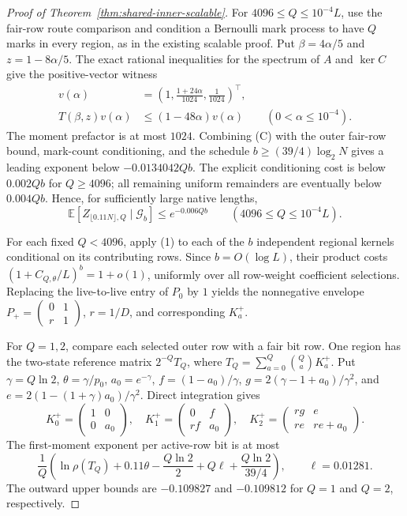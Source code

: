 \begin{proof}[Proof of Theorem~\ref{thm:shared-inner-scalable}]
For $4096\le Q\le10^{-4}L$, use the fair-row route comparison and
condition a Bernoulli mark process to have $Q$ marks in every region,
as in the existing scalable proof. Put $\beta=4\alpha/5$ and
$z=1-8\alpha/5$. The exact rational inequalities for the spectrum
of $A$ and $\ker C$ give the positive-vector witness
\[
 \begin{aligned}
 v(\alpha)&=\left(1,\frac{1+24\alpha}{1024},
                       \frac1{1024}\right)^\top,\\
 T(\beta,z)v(\alpha)&\le(1-48\alpha)v(\alpha)
 \qquad(0<\alpha\le10^{-4}).
 \end{aligned}
 \tag{C}
\]
The moment prefactor is at most $1024$. Combining (C) with the
outer fair-row bound, mark-count conditioning, and the schedule
$b\ge(39/4)\log_2N$ gives a leading exponent below
$-0.0134042Qb$. The explicit conditioning cost is below $0.002Qb$
for $Q\ge4096$; all remaining uniform remainders are eventually
below $0.004Qb$. Hence, for sufficiently large native lengths,
\[
 \mathbb E[Z_{\lfloor0.11N\rfloor,Q}\mid\mathcal G_b]
 \le e^{-0.006Qb}
 \qquad(4096\le Q\le10^{-4}L).
 \tag{D}
\]

For each fixed $Q<4096$, apply (1) to each of the $b$ independent
regional kernels conditional on its contributing rows. Since
$b=O(\log L)$, their product costs
$(1+C_{Q,\theta}/L)^b=1+o(1)$, uniformly over all row-weight
coefficient selections. Replacing the live-to-live entry of $P_0$ by
$1$ yields the nonnegative envelope
$P_+=\left(\begin{smallmatrix}0&1\\r&1\end{smallmatrix}\right)$,
$r=1/D$, and corresponding $K_a^+$.

For $Q=1,2$, compare each selected outer row with a fair bit row.
One region has the two-state reference matrix $2^{-Q}T_Q$, where
$T_Q=\sum_{a=0}^Q\binom Qa K_a^+$. Put
$\gamma=Q\ln2$, $\theta=\gamma/p_0$,
$a_0=e^{-\gamma}$,
$f=(1-a_0)/\gamma$,
$g=2(\gamma-1+a_0)/\gamma^2$, and
$e=2(1-(1+\gamma)a_0)/\gamma^2$. Direct integration gives
\[
 K_0^+=\begin{pmatrix}1&0\\0&a_0\end{pmatrix},\quad
 K_1^+=\begin{pmatrix}0&f\\rf&a_0\end{pmatrix},\quad
 K_2^+=\begin{pmatrix}rg&e\\re&re+a_0\end{pmatrix}.
\]
The first-moment exponent per active-row bit is at most
\[
 \frac1Q\left(\ln\rho(T_Q)+0.11\theta
 -\frac{Q\ln2}{2}+Q\ell+\frac{Q\ln2}{39/4}\right),
 \qquad \ell=0.01281.
\]
The outward upper bounds are $-0.109827$ and $-0.109812$ for
$Q=1$ and $Q=2$, respectively.


\end{proof}
